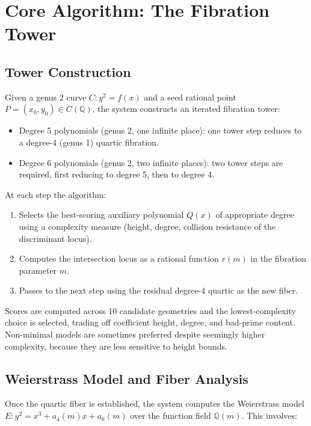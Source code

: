 \documentclass[11pt, a4paper]{article}
\begin{document}
\section{Core Algorithm: The Fibration Tower}

\subsection{Tower Construction}

Given a genus 2 curve $C: y^2 = f(x)$ and a seed rational point $P = (x_0, y_0) \in C(\mathbb{Q})$, the system constructs an iterated fibration tower:

\begin{itemize}[label={\textbullet}]
    \item Degree 5 polynomials (genus 2, one infinite place): one tower step reduces to a degree-4 (genus 1) quartic fibration.
    \item Degree 6 polynomials (genus 2, two infinite places): two tower steps are required, first reducing to degree 5, then to degree 4.
\end{itemize}

At each step the algorithm:
\begin{enumerate}
    \item Selects the best-scoring auxiliary polynomial $Q(x)$ of appropriate degree using a complexity measure (height, degree, collision resistance of the discriminant locus).
    \item Computes the intersection locus as a rational function $r(m)$ in the fibration parameter $m$.
    \item Passes to the next step using the residual degree-4 quartic as the new fiber.
\end{enumerate}

Scores are computed across 10 candidate geometries and the lowest-complexity choice is selected, trading off coefficient height, degree, and bad-prime content. Non-minimal models are sometimes preferred despite seemingly higher complexity, because they are less sensitive to height bounds.

\subsection{Weierstrass Model and Fiber Analysis}

Once the quartic fiber is established, the system computes the Weierstrass model $E: y^2 = x^3 + a_4(m)x + a_6(m)$ over the function field $\mathbb{Q}(m)$. This involves:
\end{document}
